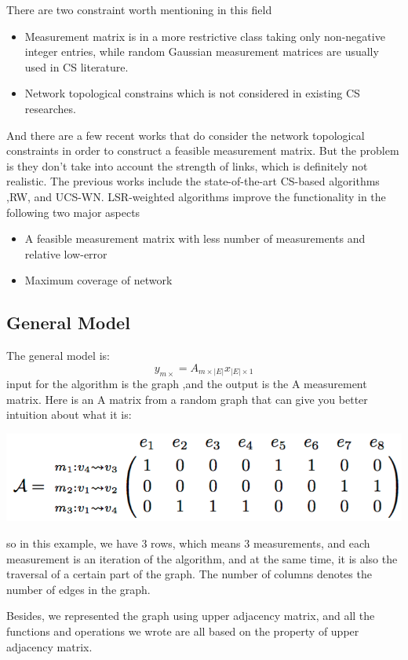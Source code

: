\documentclass{article}
\begin{document}
There are two constraint worth mentioning in this field
\begin{itemize}
\item Measurement matrix is in a more restrictive class taking only non-negative integer entries, while random Gaussian measurement matrices are usually used in CS literature.
\item Network topological constrains which is not considered in existing CS researches.
\end{itemize}
And there are a few recent works that do consider the network topological constraints in order to construct a feasible measurement matrix. But the problem is they don’t take into account the strength of links, which is definitely not realistic. The previous works include the state-of-the-art CS-based algorithms ,RW, and UCS-WN.
LSR-weighted algorithms improve the functionality in the following two major aspects
\begin{itemize}
\item A feasible measurement matrix with less number of measurements and relative low-error
\item Maximum coverage of network
\end{itemize}


\subsection{General Model}
The general model is:
$$y_{m\times} = A_{m \times |E|}x_{|E|\times1}$$
input for the algorithm is the graph ,and the output is the A measurement matrix. Here is an A matrix from a random graph that can give you better intuition about what it is:

\includegraphics{imgs/A_matrix.png}

so in this example, we have 3 rows, which means 3 measurements, and each measurement is an iteration of the algorithm, and at the same time, it is also the traversal of a certain part of the graph. The number of columns denotes the number of edges in the graph.


Besides, we represented the graph using upper adjacency matrix, and all the functions and operations we wrote are all based on the property of upper adjacency matrix.
\end{document}
